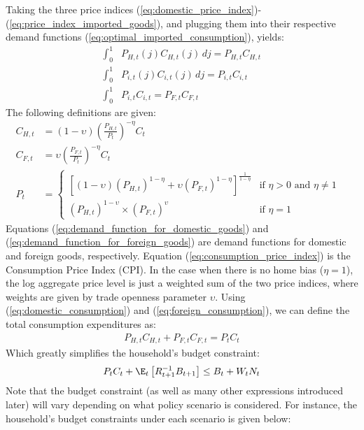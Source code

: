 Taking the three price indices (\ref{eq:domestic_price_index})-(\ref{eq:price_index_imported_goods}), and plugging them into their respective demand functions (\ref{eq:optimal_imported_consumption}), yields:
\begin{align}
    \int_{0}^{1} & P_{H,t}(j)C_{H,t}(j) \,dj = P_{H,t}C_{H,t} \label{eq:domestic_consumption}\\
    \int_{0}^{1} & P_{i,t}(j)C_{i,t}(j) \,dj = P_{i,t}C_{i,t} \\
    \int_{0}^{1} & P_{i,t}C_{i,t} = P_{F,t}C_{F,t} \label{eq:foreign_consumption}
\end{align}
The following definitions are given:
\begin{align}
    C_{H,t} & = (1-\upsilon) {\left(\frac{P_{H,t}}{P_t}\right)}^{-\eta} C_{t} \label{eq:demand_function_for_domestic_goods} & \\
    C_{F,t} & = \upsilon {\left(\frac{P_{F,t}}{P_t}\right)}^{-\eta} C_{t} \label{eq:demand_function_for_foreign_goods} & \\
    P_t &= \begin{cases}
        \left[ (1-\upsilon) (P_{H,t})^{1-\eta} + \upsilon (P_{F,t})^{1-\eta} \right]^{\frac{1}{1-\eta}} \label{eq:consumption_price_index} & \text{if $\eta > 0$ and $\eta \ne 1$}\\
        (P_{H,t})^{1-\upsilon} \times (P_{F,t})^{\upsilon} & \text{if $\eta = 1$}
    \end{cases}
\end{align}
Equations (\ref{eq:demand_function_for_domestic_goods}) and (\ref{eq:demand_function_for_foreign_goods}) are demand functions for domestic and foreign goods, respectively. Equation (\ref{eq:consumption_price_index}) is the Consumption Price Index (CPI). In the case when there is no home bias ($\eta = 1$), the log aggregate price level is just a weighted sum of the two price indices, where weights are given by trade openness parameter $\upsilon$. Using (\ref{eq:domestic_consumption}) and (\ref{eq:foreign_consumption}), we can define the total consumption expenditures as:
\begin{align}
    P_{H,t}C_{H,t} + P_{F,t}C_{F,t} = P_t C_t
\end{align}
Which greatly simplifies the household's budget constraint:
\begin{equation}
    P_t C_t + \E_t \left[ R^{-1}_{t+1} B_{t+1} \right] \leq B_t + W_t N_t
\end{equation}
Note that the budget constraint (as well as many other expressions introduced later) will vary depending on what policy scenario is considered. For instance, the household's budget constraints under each scenario is given below:
